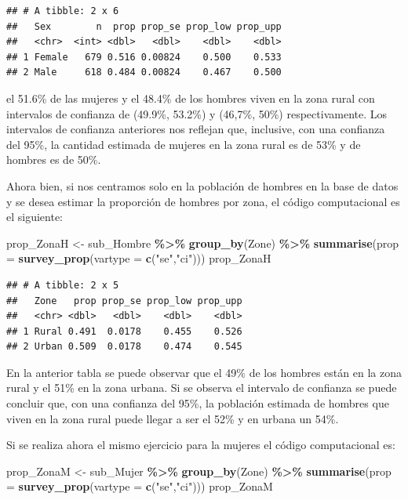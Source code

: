 \documentclass[
  12pt,
]{book}
\newenvironment{Shaded}{\begin{snugshade}}{\end{snugshade}}
\newcommand{\AttributeTok}[1]{\textcolor[rgb]{0.13,0.29,0.53}{#1}}
\newcommand{\FunctionTok}[1]{\textcolor[rgb]{0.13,0.29,0.53}{\textbf{#1}}}
\newcommand{\NormalTok}[1]{#1}
\newcommand{\OtherTok}[1]{\textcolor[rgb]{0.56,0.35,0.01}{#1}}
\newcommand{\SpecialCharTok}[1]{\textcolor[rgb]{0.81,0.36,0.00}{\textbf{#1}}}
\newcommand{\StringTok}[1]{\textcolor[rgb]{0.31,0.60,0.02}{#1}}
\begin{document}
\begin{verbatim}
## # A tibble: 2 x 6
##   Sex        n  prop prop_se prop_low prop_upp
##   <chr>  <int> <dbl>   <dbl>    <dbl>    <dbl>
## 1 Female   679 0.516 0.00824    0.500    0.533
## 2 Male     618 0.484 0.00824    0.467    0.500
\end{verbatim}

el 51.6\% de las mujeres y el 48.4\% de los hombres viven en la zona rural con intervalos de confianza de (49.9\%, 53.2\%) y (46,7\%, 50\%) respectivamente. Los intervalos de confianza anteriores nos reflejan que, inclusive, con una confianza del 95\%, la cantidad estimada de mujeres en la zona rural es de 53\% y de hombres es de 50\%.

Ahora bien, si nos centramos solo en la población de hombres en la base de datos y se desea estimar la proporción de hombres por zona, el código computacional es el siguiente:

\begin{Shaded}
\begin{Highlighting}[]
\NormalTok{prop\_ZonaH }\OtherTok{\textless{}{-}}\NormalTok{ sub\_Hombre }\SpecialCharTok{\%\textgreater{}\%} \FunctionTok{group\_by}\NormalTok{(Zone) }\SpecialCharTok{\%\textgreater{}\%} 
              \FunctionTok{summarise}\NormalTok{(}\AttributeTok{prop =} \FunctionTok{survey\_prop}\NormalTok{(}\AttributeTok{vartype =} \FunctionTok{c}\NormalTok{(}\StringTok{"se"}\NormalTok{,}\StringTok{"ci"}\NormalTok{)))}
\NormalTok{prop\_ZonaH}
\end{Highlighting}
\end{Shaded}

\begin{verbatim}
## # A tibble: 2 x 5
##   Zone   prop prop_se prop_low prop_upp
##   <chr> <dbl>   <dbl>    <dbl>    <dbl>
## 1 Rural 0.491  0.0178    0.455    0.526
## 2 Urban 0.509  0.0178    0.474    0.545
\end{verbatim}

En la anterior tabla se puede observar que el 49\% de los hombres están en la zona rural y el 51\% en la zona urbana. Si se observa el intervalo de confianza se puede concluir que, con una confianza del 95\%, la población estimada de hombres que viven en la zona rural puede llegar a ser el 52\% y en urbana un 54\%.

Si se realiza ahora el mismo ejercicio para la mujeres el código computacional es:

\begin{Shaded}
\begin{Highlighting}[]
\NormalTok{prop\_ZonaM }\OtherTok{\textless{}{-}}\NormalTok{ sub\_Mujer }\SpecialCharTok{\%\textgreater{}\%} \FunctionTok{group\_by}\NormalTok{(Zone) }\SpecialCharTok{\%\textgreater{}\%} 
              \FunctionTok{summarise}\NormalTok{(}\AttributeTok{prop =} \FunctionTok{survey\_prop}\NormalTok{(}\AttributeTok{vartype =} \FunctionTok{c}\NormalTok{(}\StringTok{"se"}\NormalTok{,}\StringTok{"ci"}\NormalTok{)))}
\NormalTok{prop\_ZonaM}
\end{Highlighting}
\end{Shaded}
\end{document}
